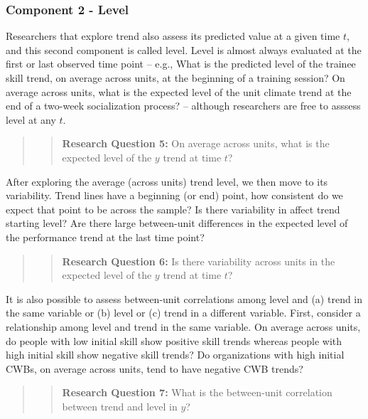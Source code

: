 \documentclass[english,,man]{apa6}
\theoremstyle{definition}
\theoremstyle{definition}
\theoremstyle{definition}
\theoremstyle{remark}
\begin{document}
\hypertarget{component-2---level}{%
\subsubsection{Component 2 - Level}\label{component-2---level}}

Researchers that explore trend also assess its predicted value at a
given time \(t\), and this second component is called level. Level is
almost always evaluated at the first or last observed time point --
e.g., What is the predicted level of the trainee skill trend, on average
across units, at the beginning of a training session? On average across
units, what is the expected level of the unit climate trend at the end
of a two-week socialization process? -- although researchers are free to
asssess level at any \(t\).

\begin{quote}
\begin{quote}
\textbf{Research Question 5:} On average across units, what is the
expected level of the \(y\) trend at time \(t\)?
\end{quote}
\end{quote}

After exploring the average (across units) trend level, we then move to
its variability. Trend lines have a beginning (or end) point, how
consistent do we expect that point to be across the sample? Is there
variability in affect trend starting level? Are there large between-unit
differences in the expected level of the performance trend at the last
time point?

\begin{quote}
\begin{quote}
\textbf{Research Question 6:} Is there variability across units in the
expected level of the \(y\) trend at time \(t\)?
\end{quote}
\end{quote}

It is also possible to assess between-unit correlations among level and
(a) trend in the same variable or (b) level or (c) trend in a different
variable. First, consider a relationship among level and trend in the
same variable. On average across units, do people with low initial skill
show positive skill trends whereas people with high initial skill show
negative skill trends? Do organizations with high initial CWBs, on
average across units, tend to have negative CWB trends?

\begin{quote}
\begin{quote}
\textbf{Research Question 7:} What is the between-unit correlation
between trend and level in \(y\)?
\end{quote}
\end{quote}
\end{document}
